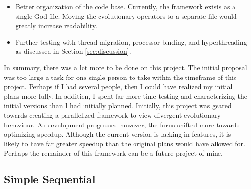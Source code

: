 \documentclass[10pt,letterpaper]{article}
\begin{document}
\begin{itemize}
\item Better organization of the code base. Currently, the framework exists as a single God file. Moving the evolutionary operators to a separate file would greatly increase readability.
\item Further testing with thread migration, processor binding, and hyperthreading as discussed in Section \ref{sec:discussion}.
\end{itemize}

In summary, there was a lot more to be done on this project. The initial proposal was too large a task for one single person to take within the timeframe of this project. Perhaps if I had several people, then I could have realized my initial plans more fully. In addition, I spent far more time testing and characterizing the initial versions than I had initially planned. Initially, this project was geared towards creating a parallelized framework to view divergent evolutionary behaviour. As development progressed however, the focus shifted more towards optimizing speedup. Although the current version is lacking in features, it is likely to have far greater speedup than the original plans would have allowed for. Perhaps the remainder of this framework can be a future project of mine.


\subsection{Simple Sequential}
\end{document}
